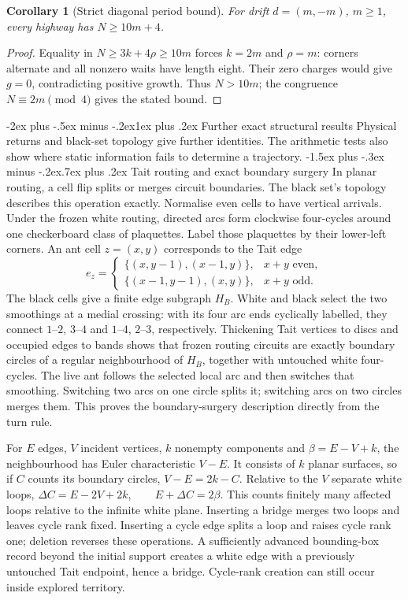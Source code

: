 \documentclass[11pt,letterpaper]{article}
\makeatletter
\renewcommand\section{\@startsection{section}{1}{\z@}%
  {-2ex plus -.5ex minus -.2ex}{1ex plus .2ex}%
  {\normalfont\Large\bfseries}}
\renewcommand\subsection{\@startsection{subsection}{2}{\z@}%
  {-1.5ex plus -.3ex minus -.2ex}{.7ex plus .2ex}%
  {\normalfont\large\bfseries}}
\newtheorem{corollary}[theorem]{Corollary}
\makeatother
\begin{document}
\begin{corollary}[Strict diagonal period bound]
For drift $d=(m,-m)$, $m\ge1$, every highway has $N\ge10m+4$.
\end{corollary}
\begin{proof}
Equality in $N\ge3k+4\rho\ge10m$ forces $k=2m$ and $\rho=m$:
corners alternate and all nonzero waits have length eight. Their zero
charges would give $g=0$, contradicting positive growth. Thus $N>10m$;
the congruence $N\equiv2m\pmod4$ gives the stated bound.
\end{proof}

\section{Further exact structural results}
Physical returns and black-set topology give further identities.
The arithmetic tests also show where static information fails to
determine a trajectory.
\subsection{Tait routing and exact boundary surgery}
In planar routing, a cell flip splits or merges circuit boundaries.
The black set's topology describes this operation exactly. Normalise even cells to have vertical arrivals. Under the frozen white
routing, directed arcs form clockwise four-cycles around one checkerboard
class of plaquettes. Label those plaquettes by their lower-left corners.
An ant cell $z=(x,y)$ corresponds to the Tait edge
\[
e_z=\begin{cases}
\{(x,y-1),(x-1,y)\},&x+y\text{ even},\\
\{(x-1,y-1),(x,y)\},&x+y\text{ odd}.
\end{cases}
\]
The black cells give a finite edge subgraph $H_B$. White and black
select the two smoothings at a medial crossing: with its four arc ends
cyclically labelled, they connect $1$--$2$, $3$--$4$ and
$1$--$4$, $2$--$3$, respectively. Thickening Tait vertices to discs
and occupied edges to bands shows that frozen routing circuits are
exactly boundary circles of a regular neighbourhood of $H_B$, together
with untouched white four-cycles. The live ant follows the selected
local arc and then switches that smoothing. Switching two arcs on one
circle splits it; switching arcs on two circles merges them. This proves
the boundary-surgery description directly from the turn rule.

For $E$ edges, $V$ incident vertices, $k$ nonempty components and
$\beta=E-V+k$, the neighbourhood has Euler characteristic $V-E$.
It consists of $k$ planar surfaces, so if $C$ counts its boundary
circles, $V-E=2k-C$. Relative to the $V$ separate white loops,
$\Delta C=E-2V+2k,\qquad E+\Delta C=2\beta$.
This counts finitely many affected loops relative to the infinite white plane. Inserting a bridge merges two loops and leaves cycle rank
fixed. Inserting a cycle edge splits a loop and raises cycle rank one;
deletion reverses these operations. A sufficiently advanced bounding-box
record beyond the initial support creates a white edge with a previously
untouched Tait endpoint, hence a bridge. Cycle-rank creation can still
occur inside explored territory.
\end{document}
